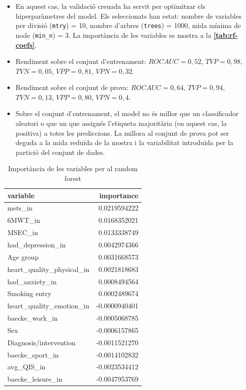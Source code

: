 \documentclass[CAT]{TFUOC}%
\begin{document}
\begin{itemize}
\item
  En aquest cas, la validació creuada ha servit per optimitzar els hiperparàmetres del model. Els seleccionats han estat: nombre de variables per divisió (\texttt{mtry}) = 10, nombre d'arbres (\texttt{trees}) = 1000, mida mínima de node (\texttt{min\_n}) = 3. La importància de les variables es mostra a la \textbf{\autoref{tab:rf-coefs}}.
\item
  Rendiment sobre el conjunt d'entrenament: \(ROC AUC = 0,52\), \(TVP = 0,98\), \(TVN = 0,05\), \(VPP = 0,81\), \(VPN = 0,32\).
\item
  Rendiment sobre el conjunt de prova: \(ROC AUC = 0,64\), \(TVP = 0,94\), \(TVN = 0,13\), \(VPP = 0,80\), \(VPN = 0,4\).
\item
  Sobre el conjunt d'entrenament, el model no és millor que un classificador aleatori o que un que assignés l'etiqueta majoritària (en aquest cas, la positiva) a totes les prediccions. La millora al conjunt de prova pot ser deguda a la mida reduïda de la mostra i la variabilitat introduïda per la partició del conjunt de dades.
\end{itemize}

\begin{table}[t]
\caption{\label{tab:rf-coefs}Importància de les variables per al random forest} 
\fontsize{12.0pt}{14.0pt}\selectfont
\begin{tabular*}{\linewidth}{@{\extracolsep{\fill}}lr}
\toprule
variable & importance \\ 
\midrule\addlinespace[2.5pt]
mets\_in & 0.0219594222 \\ 
6MWT\_in & 0.0168352021 \\ 
MSEC\_in & 0.0133338749 \\ 
had\_depression\_in & 0.0042974366 \\ 
Age group & 0.0031668573 \\ 
heart\_quality\_physical\_in & 0.0021818683 \\ 
had\_anxiety\_in & 0.0008494564 \\ 
Smoking entry & 0.0002489674 \\ 
heart\_quality\_emotion\_in & -0.0000940401 \\ 
baecke\_work\_in & -0.0005068785 \\ 
Sex & -0.0006157865 \\ 
Diagnosis/intervention & -0.0011521270 \\ 
baecke\_sport\_in & -0.0014102832 \\ 
avg\_QIS\_in & -0.0023534412 \\ 
baecke\_leisure\_in & -0.0047953769 \\ 
\bottomrule
\end{tabular*}
\end{table}
\end{document}
